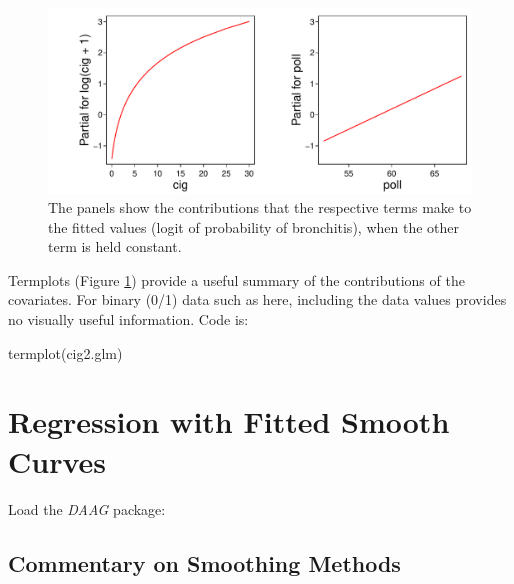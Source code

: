 \begin{figure}[h]
\begin{Schunk}


\centerline{\includegraphics[width=\textwidth]{figs/8-cig2-tplot-1} }

\end{Schunk}
\caption{The panels show the contributions that the respective terms
  make to the fitted values (logit of probability of bronchitis), when
  the other term is held constant.\label{fig:xy-cig}}
\end{figure}

Termplots (Figure \ref{fig:xy-cig}) provide a useful summary of the
contributions of the covariates.  For binary (0/1) data such as here,
including the data values provides no visually useful information.
Code is:
\begin{Schunk}
\begin{Sinput}
termplot(cig2.glm)
\end{Sinput}
\end{Schunk}

\section{Regression with Fitted Smooth Curves}

Load the {\em DAAG} package:


\subsection*{Commentary  on Smoothing Methods}

